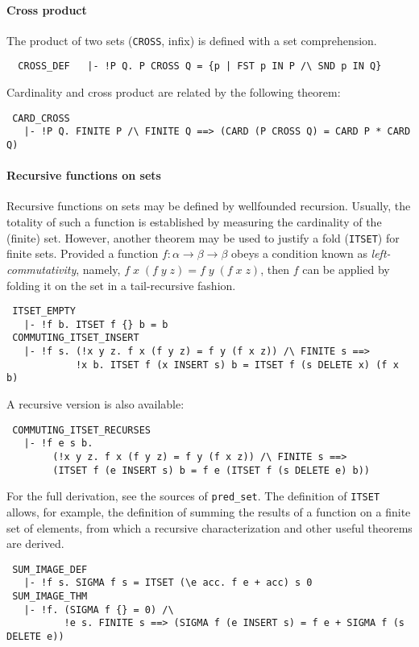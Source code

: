 \paragraph{Cross product}
The product of two sets ({\small\verb+CROSS+}, infix) is defined
with a set comprehension.
%
{\small
\begin{verbatim}
  CROSS_DEF   |- !P Q. P CROSS Q = {p | FST p IN P /\ SND p IN Q}
\end{verbatim}}
%
\noindent Cardinality and cross product are related by the following theorem:
{\small
\begin{verbatim}
 CARD_CROSS
   |- !P Q. FINITE P /\ FINITE Q ==> (CARD (P CROSS Q) = CARD P * CARD Q)
\end{verbatim}}
%
\paragraph{Recursive functions on sets}

Recursive functions on sets may be defined by wellfounded
recursion. Usually, the totality of such a function is established by
measuring the cardinality of the (finite) set. However, another
theorem may be used to justify a fold ({\small\verb+ITSET+}) for finite sets.
Provided a function $f:\alpha\to\beta\to\beta$ obeys a condition
known as \emph{left-commutativity}, namely, $f\;x\;(f\;y\;z) =
f\;y\;(f\;x\;z)$, then $f$ can be applied by folding it on the set
in a tail-recursive fashion.
%
{\small
\begin{verbatim}
 ITSET_EMPTY
   |- !f b. ITSET f {} b = b
 COMMUTING_ITSET_INSERT
   |- !f s. (!x y z. f x (f y z) = f y (f x z)) /\ FINITE s ==>
            !x b. ITSET f (x INSERT s) b = ITSET f (s DELETE x) (f x b)
\end{verbatim}}
%
\noindent A recursive version is also available:
{\small
\begin{verbatim}
 COMMUTING_ITSET_RECURSES
   |- !f e s b.
        (!x y z. f x (f y z) = f y (f x z)) /\ FINITE s ==>
        (ITSET f (e INSERT s) b = f e (ITSET f (s DELETE e) b))
\end{verbatim}}
%
For the full derivation, see the sources of {\small\verb+pred_set+}.
The definition of {\small\verb+ITSET+} allows, for example, the
definition of summing the results of a function on a finite set of elements,
from which a recursive characterization and other useful theorems are derived.
%
{\small
\begin{verbatim}
 SUM_IMAGE_DEF
   |- !f s. SIGMA f s = ITSET (\e acc. f e + acc) s 0
 SUM_IMAGE_THM
   |- !f. (SIGMA f {} = 0) /\
          !e s. FINITE s ==> (SIGMA f (e INSERT s) = f e + SIGMA f (s DELETE e))
\end{verbatim}}

